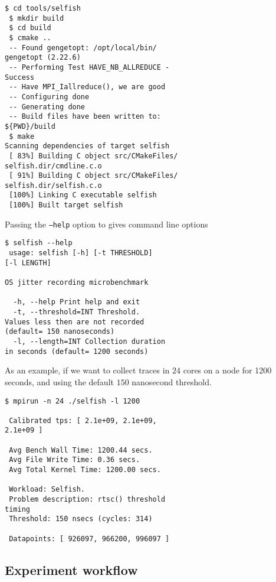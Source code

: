 \begin{Verbatim}[commandchars=\\\{\},frame=single]
 $ cd tools/selfish
 $ mkdir build
 $ cd build
 $ cmake ..
 -- Found gengetopt: /opt/local/bin/
gengetopt (2.22.6)
 -- Performing Test HAVE_NB_ALLREDUCE -
Success
 -- Have MPI_Iallreduce(), we are good
 -- Configuring done
 -- Generating done
 -- Build files have been written to:
${PWD}/build
 $ make 
Scanning dependencies of target selfish
 [ 83%] Building C object src/CMakeFiles/
selfish.dir/cmdline.c.o
 [ 91%] Building C object src/CMakeFiles/
selfish.dir/selfish.c.o
 [100%] Linking C executable selfish
 [100%] Built target selfish

\end{Verbatim}

Passing the {\texttt{--help}} option to \selfish gives command line options

\begin{Verbatim}[commandchars=\\\{\},frame=single]
 $ selfish --help
 usage: selfish [-h] [-t THRESHOLD]
[-l LENGTH]

OS jitter recording microbenchmark

  -h, --help Print help and exit
  -t, --threshold=INT Threshold.
Values less then are not recorded
(default= 150 nanoseconds)
  -l, --length=INT Collection duration
in seconds (default= 1200 seconds)

\end{Verbatim}

As an example, if we want to collect \selfish traces in $24$ cores on a node for
1200 seconds, and using the default $150$ nanosecond threshold.

\begin{Verbatim}[commandchars=\\\{\},frame=single]
 $ mpirun -n 24 ./selfish -l 1200

 Calibrated tps: [ 2.1e+09, 2.1e+09,
2.1e+09 ]

 Avg Bench Wall Time: 1200.44 secs.
 Avg File Write Time: 0.36 secs.
 Avg Total Kernel Time: 1200.00 secs.

 Workload: Selfish.
 Problem description: rtsc() threshold
timing
 Threshold: 150 nsecs (cycles: 314)

 Datapoints: [ 926097, 966200, 996097 ]
\end{Verbatim}

\subsection{Experiment workflow}

